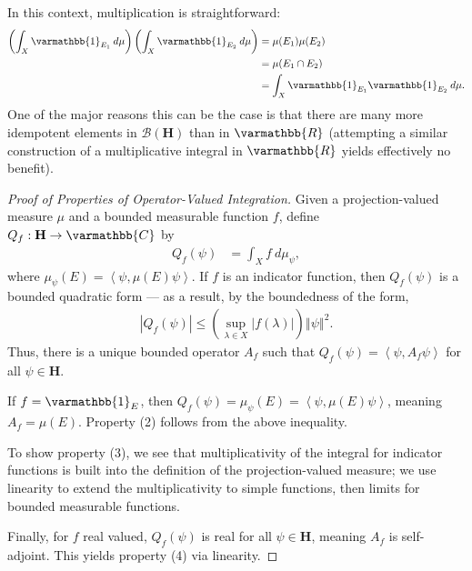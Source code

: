 \documentclass[12pt]{extarticle}
\newcommand{\R}{\varmathbb{R}}
\newcommand{\C}{\varmathbb{C}}
\newcommand{\iprod}[2]{\left\langle #1,#2\right\rangle}
\newcommand{\norm}[1]{\left\Vert #1\right\Vert}
\theoremstyle{plain}
\theoremstyle{definition}
\theoremstyle{remark}
\renewcommand{\newline}{\hfill\break}
\begin{document}
  In this context, multiplication is straightforward:
  \begin{align*}
    \left(\int_{X}^{} \varmathbb{1}_{E_1}\:d\mu\right)\left(\int_{X}^{} \varmathbb{1}_{E_2}\:d\mu\right) &= \mu(E_1)\mu(E_2)\\
                                                                                                   &= \mu(E_1 \cap E_2)\\
                                                                                                   &= \int_{X}^{} \varmathbb{1}_{E_1}\varmathbb{1}_{E_2}\:d\mu.
  \end{align*}
  One of the major reasons this can be the case is that there are many more idempotent elements in $\mathcal{B}(\mathbf{H})$ than in $\R$ (attempting a similar construction of a multiplicative integral in $\R$ yields effectively no benefit).
  \begin{proof}[Proof of Properties of Operator-Valued Integration]
    Given a projection-valued measure $\mu$ and a bounded measurable function $f$, define $Q_{f}: \mathbf{H}\rightarrow \C$ by
    \begin{align*}
      Q_f(\psi) &= \int_{X}^{}f \:d\mu_{\psi},
    \end{align*}
    where $\mu_{\psi}(E) = \iprod{\psi}{\mu(E)\psi}$. If $f$ is an indicator function, then $Q_f(\psi)$ is a bounded quadratic form --- as a result, by the boundedness of the form,
    \begin{align*}
      |Q_f(\psi)| \leq \left(\sup_{\lambda \in X}|f(\lambda)|\right)\norm{\psi}^2.
    \end{align*}
    Thus, there is a unique bounded operator $A_f$ such that $Q_f(\psi) = \iprod{\psi}{A_f\psi}$ for all $\psi \in \mathbf{H}$.\newline

    If $f = \varmathbb{1}_E$, then $Q_f(\psi) = \mu_{\psi}(E) = \iprod{\psi}{\mu(E)\psi}$, meaning $A_f = \mu(E)$. Property (2) follows from the above inequality.\newline

    To show property (3), we see that multiplicativity of the integral for indicator functions is built into the definition of the projection-valued measure; we use linearity to extend the multiplicativity to simple functions, then limits for bounded measurable functions.\newline

    Finally, for $f$ real valued, $Q_f(\psi)$ is real for all $\psi \in \mathbf{H}$, meaning $A_f$ is self-adjoint. This yields property (4) via linearity.
  \end{proof}
\end{document}
